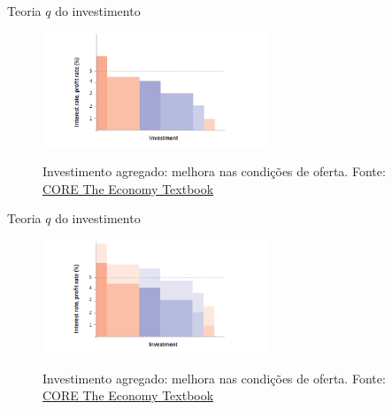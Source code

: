\documentclass[10pt]{beamer}
\begin{document}
\begin{frame}
    {Teoria $q$ do investimento}
    \begin{figure}
        \centering
        \href{https://core-econ.org/the-economy/book/text/14.html\#144-investment-spending}{\includegraphics[width=0.6\textwidth]{./figures/aula8_fig7.PNG}}
        \caption{Investimento agregado: melhora nas condições de oferta. Fonte: \href{https://core-econ.org/the-economy/book/text/14.html\#144-investment-spending}{CORE The Economy Textbook}}
    \end{figure}
\end{frame}

\begin{frame}
    {Teoria $q$ do investimento}
    \begin{figure}
        \centering
        \href{https://core-econ.org/the-economy/book/text/14.html\#144-investment-spending}{\includegraphics[width=0.6\textwidth]{./figures/aula8_fig8.PNG}}
        \caption{Investimento agregado: melhora nas condições de oferta. Fonte: \href{https://core-econ.org/the-economy/book/text/14.html\#144-investment-spending}{CORE The Economy Textbook}}
    \end{figure}
\end{frame}
\end{document}
